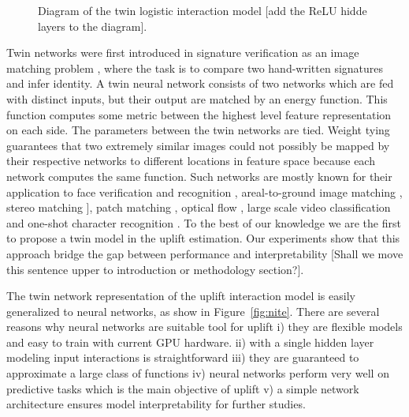 \documentclass{article}
\def \vahid {\color{magenta}}
\begin{document}
\begin{figure}[!ht]
    \centering
    
    \caption{Diagram of the twin logistic interaction model {\vahid [add the ReLU hidde layers to the diagram]}.}
    \label{fig:siamese_network}
\end{figure}


Twin  networks were first introduced in signature verification as an image matching problem \citep{bromley1994signature}, where the task is to compare two hand-written signatures and infer identity. A twin  neural network consists of two  networks which are fed with distinct inputs, but their output are matched by an energy function. This function computes some metric between the highest level feature representation on each side. The parameters between the twin networks are tied. Weight tying guarantees that two extremely similar images could not possibly be mapped by their respective networks to  different locations in feature space because each network computes the same function. Such networks are mostly known for their application to face verification and recognition \citep{chopra2005learning,taigman2014deepface,parkhi2015deep,schroff2015facenet}, areal-to-ground image matching \citep{lin2015learning}, stereo matching \citep{zbontar2015computing}], patch matching \citep{han2015matchnet, simo2015discriminative,zagoruyko2015learning}, optical flow \citep{dosovitskiy2015flownet}, large scale video classification \citep{karpathy2014large} and one-shot character recognition \citep{koch2015siamese}. To the best of our knowledge we are the first to propose a twin model in the uplift estimation. Our experiments show that this approach bridge the gap between performance and interpretability {\vahid [Shall we move this sentence upper to introduction or methodology section?]}. 

%

The twin network  representation of the uplift interaction model is easily generalized to neural networks, as show in Figure~\ref{fig:nite}. There are several reasons why neural networks are suitable tool for uplift i)  they are flexible models and easy to train with current GPU hardware. ii) with a single hidden layer modeling input interactions is straightforward \citep{tsang2018neural} iii) they are guaranteed to approximate a large class of  functions \citep{cybenko1989approximation, hornik1991approximation, pinkus1999approximation} iv) neural networks perform very well on predictive tasks which is the main objective of uplift v)  a simple network architecture ensures model interpretability for further studies. 
\end{document}
